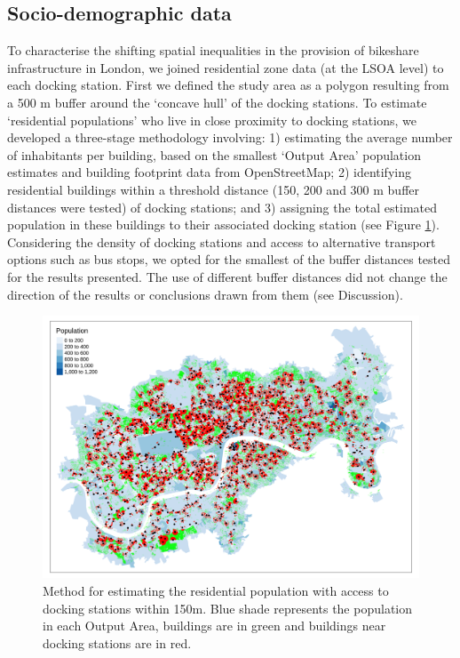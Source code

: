 \documentclass[]{article}
\begin{document}
\hypertarget{socio-demographic-data}{%
\subsection{Socio-demographic data}\label{socio-demographic-data}}

To characterise the shifting spatial inequalities in the provision of bikeshare infrastructure in London, we joined residential zone data (at the LSOA level) to each docking station.
First we defined the study area as a polygon resulting from a 500 m buffer around the `concave hull' of the docking stations.
To estimate `residential populations' who live in close proximity to docking stations, we developed a three-stage methodology involving: 1) estimating the average number of inhabitants per building, based on the smallest `Output Area' population estimates and building footprint data from OpenStreetMap; 2) identifying residential buildings within a threshold distance (150, 200 and 300 m buffer distances were tested) of docking stations; and 3) assigning the total estimated population in these buildings to their associated docking station (see Figure \ref{fig:bikeshare-resi-buildings}).
Considering the density of docking stations and access to alternative transport options such as bus stops, we opted for the smallest of the buffer distances tested for the results presented.
The use of different buffer distances did not change the direction of the results or conclusions drawn from them (see Discussion).

\begin{figure}

{\centering \includegraphics[width=0.7\linewidth]{figures/bikeshare-resi-buildings} 

}

\caption{Method for estimating the residential population with access to docking stations within 150m. Blue shade represents the population in each Output Area, buildings are in green and buildings near docking stations are in red.}\label{fig:bikeshare-resi-buildings}
\end{figure}
\end{document}

